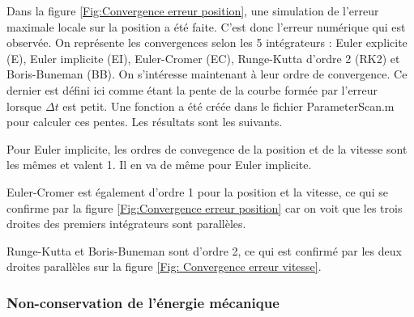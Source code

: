 \documentclass[a4paper,12pt,twoside]{article}
\begin{document}
		\noindent Dans la figure \ref{Fig:Convergence erreur position}, une simulation de l'erreur maximale locale sur la position a \'et\'e faite. C'est donc l'erreur num\'erique qui est observ\'ee. On repr\'esente les convergences selon les 5 int\'egrateurs : Euler explicite (E), Euler implicite (EI), Euler-Cromer (EC), Runge-Kutta d'ordre 2 (RK2) et Boris-Buneman (BB). On s'int\'eresse maintenant \`a leur ordre de convergence. Ce dernier est d\'efini ici comme \'etant la pente de la courbe form\'ee par l'erreur lorsque $\Delta t$ est petit. Une fonction a \'et\'e cr\'e\'ee dans le fichier ParameterScan.m pour calculer ces pentes. Les résultats sont les suivants.
		
		\noindent Pour Euler implicite, les ordres de convegence de la position et de la vitesse sont les m\^emes et valent 1. Il en va de m\^eme pour Euler implicite.
		
		\noindent Euler-Cromer est \'egalement d'ordre 1 pour la position et la vitesse, ce qui se confirme par la figure \ref{Fig:Convergence erreur position} car on voit que les trois droites des premiers int\'egrateurs sont parall\`eles. 
		
		\noindent Runge-Kutta et Boris-Buneman sont d'ordre 2, ce qui est confirmé par les deux droites parall\`eles sur la figure \ref{Fig: Convergence erreur vitesse}.
		
		
		
		

		\subsubsection{Non-conservation de l'\'energie m\'ecanique}
		
\end{document}
